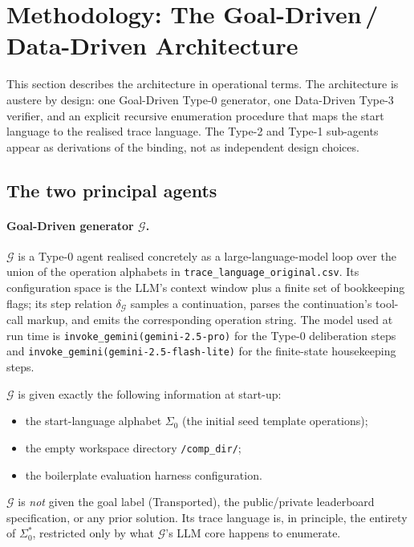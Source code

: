 \section{Methodology: The Goal-Driven\,/\,Data-Driven Architecture}
\label{sec:methodology}

This section describes the architecture in operational terms.
The architecture is austere by design: one Goal-Driven Type-0
generator, one Data-Driven Type-3 verifier, and an explicit
recursive enumeration procedure that maps the start language to
the realised trace language.  The Type-2 and Type-1 sub-agents
appear as derivations of the binding, not as independent design
choices.

\subsection{The two principal agents}

\paragraph{Goal-Driven generator $\mathcal{G}$.}
$\mathcal{G}$ is a Type-0 agent realised concretely as a
large-language-model loop over the union of the operation
alphabets in \texttt{trace\_language\_original.csv}.  Its
configuration space is the LLM's context window plus a finite
set of bookkeeping flags; its step relation
$\delta_\mathcal{G}$ samples a continuation, parses the
continuation's tool-call markup, and emits the corresponding
operation string.  The model used at run time is
\texttt{invoke\_gemini(gemini-2.5-pro)} for the Type-0 deliberation
steps and \texttt{invoke\_gemini(gemini-2.5-flash-lite)} for the
finite-state housekeeping steps.

$\mathcal{G}$ is given exactly the following information at
start-up:
\begin{itemize}
\item the start-language alphabet
$\Sigma_0$ (the initial seed template operations);
\item the empty workspace directory \texttt{/comp\_dir/};
\item the boilerplate evaluation harness configuration.
\end{itemize}
$\mathcal{G}$ is \emph{not} given the goal label
(\textsf{Transported}), the public/private leaderboard
specification, or any prior solution.  Its trace language is, in
principle, the entirety of $\Sigma_0^*$, restricted only by what
$\mathcal{G}$'s LLM core happens to enumerate.

